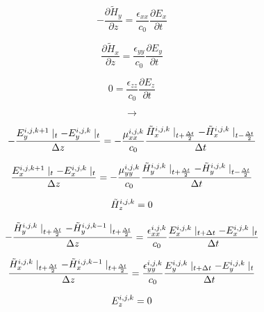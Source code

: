 \documentclass[a4paper,10pt]{article}
\begin{document}
\begin{equation*}
  - \frac{\partial \tilde{H}_y}{\partial z} = \frac{\epsilon_{xx}}{c_0}\frac{\partial E_x}{\partial t}
\end{equation*}

\begin{equation*}
  \frac{\partial \tilde{H}_x}{\partial z} = \frac{\epsilon_{yy}}{c_0}\frac{\partial E_y}{\partial t}
\end{equation*}

\begin{equation*}
  0 = \frac{\epsilon_{zz}}{c_0}\frac{\partial E_z}{\partial t}
\end{equation*}

\[\longrightarrow\]

\begin{equation*}
  - \frac{E_{y}^{i,j,k+1}\mid_{t} - E_{y}^{i,j,k}\mid_{t}}{\Delta z} = -\frac{\mu_{xx}^{i,j,k}}{c_0} \frac{\tilde{H}_{x}^{i,j,k}\mid_{t+\frac  {\Delta t}{2}} - \tilde{H}_{x}^{i,j,k}\mid_{t-\frac{\Delta t}{2}}}{\Delta t}\notag
\end{equation*}

\begin{equation*}
  \frac{E_{x}^{i,j,k+1}\mid_{t} - E_{x}^{i,j,k}\mid_{t}}{\Delta z} = -\frac{\mu_{yy}^{i,j,k}}{c_0} \frac{\tilde{H}_{y}^{i,j,k}\mid_{t+\frac  {\Delta t}{2}} - \tilde{H}_{y}^{i,j,k}\mid_{t-\frac{\Delta t}{2}}}{\Delta t}\notag
\end{equation*}

\begin{equation*}
  \tilde{H}_{z}^{i,j,k} = 0\notag
\end{equation*}

\begin{equation*}
  - \frac{\tilde{H}_{y}^{i,j,k}\mid_{t+\frac  {\Delta t}{2}} - \tilde{H}_{y}^{i,j,k-1}\mid_{t+\frac  {\Delta t}{2}}}{\Delta z} = \frac{\epsilon_{xx}^{i,j,k}}{c_0} \frac{E_{x}^{i,j,k}\mid_{t+\Delta t} - E_{x}^{i,j,k}\mid_{t}}{\Delta t}\notag
\end{equation*}

\begin{equation*}
  \frac{\tilde{H}_{x}^{i,j,k}\mid_{t+\frac{\Delta t}{2}} - \tilde{H}_{x}^{i,j,k-1}\mid_{t+\frac  {\Delta t}{2}}}{\Delta z} = \frac{\epsilon_{yy}^{i,j,k}}{c_0} \frac{E_{y}^{i,j,k}\mid_{t+\Delta t} - E_{y}^{i,j,k}\mid_{t}}{\Delta t}\notag
\end{equation*}

\begin{equation*}
  E_{z}^{i,j,k} = 0\notag
\end{equation*}
\end{document}

